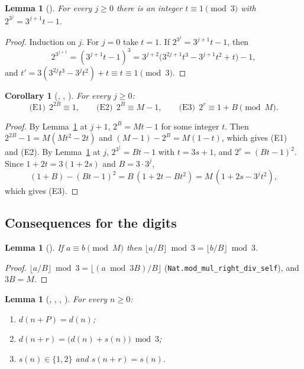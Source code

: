 \documentclass[11pt]{amsart}
\theoremstyle{plain}
\newtheorem{lemma}[theorem]{Lemma}
\newtheorem{corollary}[theorem]{Corollary}
\theoremstyle{definition}
\begin{document}
\begin{lemma}[]\label{lem:key}
For every $j\ge0$ there is an integer $t\equiv1\pmod3$ with $2^{3^j}=3^{j+1}t-1$.
\end{lemma}

\begin{proof}
Induction on $j$. For $j=0$ take $t=1$. If $2^{3^j}=3^{j+1}t-1$, then
\[
  2^{3^{j+1}}=(3^{j+1}t-1)^3=3^{j+2}\bigl(3^{2j+1}t^3-3^{j+1}t^2+t\bigr)-1,
\]
and $t'=3(3^{2j}t^3-3^jt^2)+t\equiv t\equiv1\pmod 3$.
\end{proof}

\begin{corollary}[, , ]\label{cor:E}
For every $j\ge0$:
\[
 \text{(E1)}\ \ 2^{2B}\equiv1,\qquad \text{(E2)}\ \ 2^{B}\equiv M-1,\qquad \text{(E3)}\ \ 2^{r}\equiv1+B \pmod M.
\]
\end{corollary}

\begin{proof}
By Lemma~\ref{lem:key} at $j+1$, $2^B=Mt-1$ for some integer $t$. Then $2^{2B}-1=M(Mt^2-2t)$ and $(M-1)-2^B=M(1-t)$, which gives (E1) and (E2). By Lemma~\ref{lem:key} at $j$, $2^{3^j}=Bt-1$ with $t=3s+1$, and $2^r=(Bt-1)^2$. Since $1+2t=3(1+2s)$ and $B=3\cdot3^j$,
\[
  (1+B)-(Bt-1)^2=B\,(1+2t-Bt^2)=M\,(1+2s-3^jt^2),
\]
which gives (E3).
\end{proof}

\subsection{Consequences for the digits}

\begin{lemma}[]\label{lem:congr}
If $a\equiv b\pmod M$ then $\lfloor a/B\rfloor \bmod 3=\lfloor b/B\rfloor \bmod 3$.
\end{lemma}

\begin{proof}
$\lfloor a/B\rfloor \bmod 3=\lfloor (a \bmod 3B)/B\rfloor$ (\texttt{Nat.mod\_mul\_right\_div\_self}), and $3B=M$.
\end{proof}

\begin{lemma}[, , , ]\label{lem:shift}
For every $n\ge0$:
\begin{enumerate}
\item[(a)] $d(n+P)=d(n)$;
\item[(b)] $d(n+r)=\bigl(d(n)+s(n)\bigr)\bmod 3$;
\item[(c)] $s(n)\in\{1,2\}$ and $s(n+r)=s(n)$.
\end{enumerate}
\end{lemma}
\end{document}
